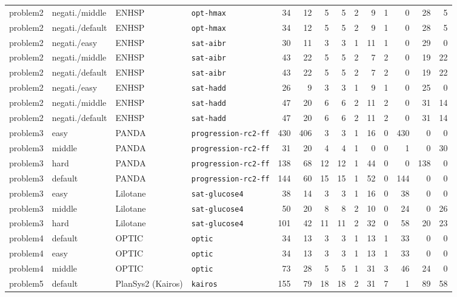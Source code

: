 \begin{table}[htbp]
{\begin{tabular}{llll r rrrrrr rrr}
problem2 & negati./middle & ENHSP & \texttt{opt-hmax} & 34 & 12 & 5 & 5 & 2 & 9 & 1 & 0 & 28 & 5 \\
problem2 & negati./default & ENHSP & \texttt{opt-hmax} & 34 & 12 & 5 & 5 & 2 & 9 & 1 & 0 & 28 & 5 \\
problem2 & negati./easy & ENHSP & \texttt{sat-aibr} & 30 & 11 & 3 & 3 & 1 & 11 & 1 & 0 & 29 & 0 \\
problem2 & negati./middle & ENHSP & \texttt{sat-aibr} & 43 & 22 & 5 & 5 & 2 & 7 & 2 & 0 & 19 & 22 \\
problem2 & negati./default & ENHSP & \texttt{sat-aibr} & 43 & 22 & 5 & 5 & 2 & 7 & 2 & 0 & 19 & 22 \\
problem2 & negati./easy & ENHSP & \texttt{sat-hadd} & 26 & 9 & 3 & 3 & 1 & 9 & 1 & 0 & 25 & 0 \\
problem2 & negati./middle & ENHSP & \texttt{sat-hadd} & 47 & 20 & 6 & 6 & 2 & 11 & 2 & 0 & 31 & 14 \\
problem2 & negati./default & ENHSP & \texttt{sat-hadd} & 47 & 20 & 6 & 6 & 2 & 11 & 2 & 0 & 31 & 14 \\
\midrule
problem3 & easy & PANDA & \texttt{progression-rc2-ff} & 430 & 406 & 3 & 3 & 1 & 16 & 0 & 430 & 0 & 0 \\
problem3 & middle & PANDA & \texttt{progression-rc2-ff} & 31 & 20 & 4 & 4 & 1 & 0 & 0 & 1 & 0 & 30 \\
problem3 & hard & PANDA & \texttt{progression-rc2-ff} & 138 & 68 & 12 & 12 & 1 & 44 & 0 & 0 & 138 & 0 \\
problem3 & default & PANDA & \texttt{progression-rc2-ff} & 144 & 60 & 15 & 15 & 1 & 52 & 0 & 144 & 0 & 0 \\
problem3 & easy & Lilotane & \texttt{sat-glucose4} & 38 & 14 & 3 & 3 & 1 & 16 & 0 & 38 & 0 & 0 \\
problem3 & middle & Lilotane & \texttt{sat-glucose4} & 50 & 20 & 8 & 8 & 2 & 10 & 0 & 24 & 0 & 26 \\
problem3 & hard & Lilotane & \texttt{sat-glucose4} & 101 & 42 & 11 & 11 & 2 & 32 & 0 & 58 & 20 & 23 \\
\midrule
problem4 & default & OPTIC & \texttt{optic} & 34 & 13 & 3 & 3 & 1 & 13 & 1 & 33 & 0 & 0 \\
problem4 & easy & OPTIC & \texttt{optic} & 34 & 13 & 3 & 3 & 1 & 13 & 1 & 33 & 0 & 0 \\
problem4 & middle & OPTIC & \texttt{optic} & 73 & 28 & 5 & 5 & 1 & 31 & 3 & 46 & 24 & 0 \\
\midrule
problem5 & default & PlanSys2 (Kairos) & \texttt{kairos} & 155 & 79 & 18 & 18 & 2 & 31 & 7 & 1 & 89 & 58 \\
\bottomrule
\end{tabular}%
}
\end{table}
